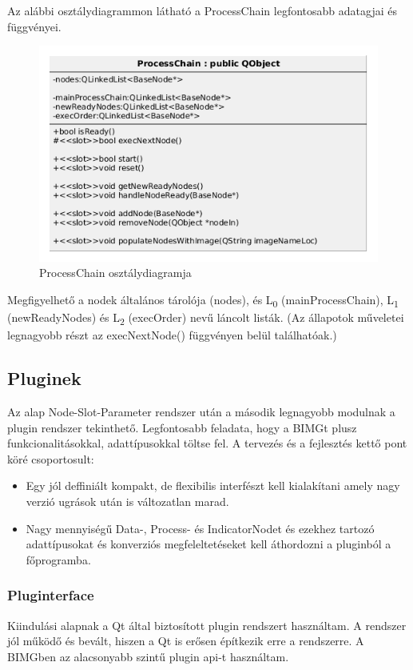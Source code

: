 \documentclass[a4paper,12pt,oneside]{report}
\begin{document}
Az alábbi osztálydiagrammon látható a ProcessChain legfontosabb adatagjai és függvényei.
\begin{center}
\begin{figure}[h]
  \includegraphics[width=1.0\textwidth]{process_chain_diag.png}
  \caption{ProcessChain osztálydiagramja }

  \label{fig:bimg_processchain_diag}
\end{figure}
\end{center}
Megfigyelhető a nodek általános tárolója (nodes), és L\textsubscript{0} (mainProcessChain), L\textsubscript{1} (newReadyNodes) és L\textsubscript{2} (execOrder) nevű láncolt listák. (Az állapotok műveletei legnagyobb részt az execNextNode() függvényen belül találhatóak.)

\subsection{Pluginek}
Az alap Node-Slot-Parameter rendszer után a második legnagyobb modulnak a plugin rendszer tekinthető. Legfontosabb feladata, hogy a BIMGt plusz funkcionalitásokkal, adattípusokkal töltse fel. A tervezés és a fejlesztés kettő pont köré csoportosult:
			\begin{itemize}
			\itemsep0em
			\item Egy jól deffiniált kompakt, de flexibilis interfészt kell kialakítani amely nagy verzió ugrások után is változatlan marad.
			\item Nagy mennyiségű Data-, Process- és IndicatorNodet és ezekhez tartozó adattípusokat és konverziós megfeleltetéseket kell áthordozni a pluginból a főprogramba.
		\end{itemize}

\subsubsection{Pluginterface}
Kiindulási alapnak a Qt által biztosított plugin rendszert használtam. A rendszer jól működő és bevált, hiszen a Qt is erősen építkezik erre a rendszerre\cite{website:qt_plugin}.  A BIMGben az alacsonyabb szintű plugin api-t használtam.
\end{document}
